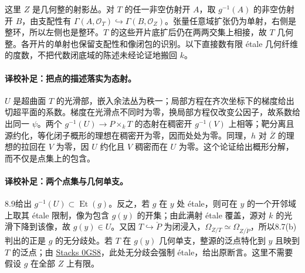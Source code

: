这里 $Z$ 是几何整的射影丛。对 $T$ 的任一非空仿射开 $A$，取 $g^{-1}(A)$ 的非空仿射开 $B$，由支配性有 $\Gamma(A,\mathcal O_T)\hookrightarrow\Gamma(B,\mathcal O_Z)$。张量任意域扩张仍为单射，右侧是整环，所以左侧也是整环。$T$ 的这些开片底扩后仍在两两交集上相接，故 $T$ 几何整。各开片的单射也保留支配性和像闭包的识别。以下直接数有限 étale 几何纤维的度数，不把代数闭底域的陈述未经论证地搬回 $k$。

\paragraph{译校补足：把点的描述落实为态射。}
$U$ 是超曲面 $T$ 的光滑部，嵌入余法丛为秩一；局部方程在齐次坐标下的梯度给出切超平面的系数。梯度在光滑点不同时为零，换局部方程仅改变公因子，故系数给出同一 $\psi$。两个 $g^{-1}(U)\to P\times_k T$ 的态射在稠密开 $g^{-1}(V)$ 上相等；靶分离且源约化，等化闭子概形的理想在稠密开为零，因而处处为零。同理，$h$ 对 $\overline Z$ 的理想的拉回在 $V$ 为零，因 $U$ 约化且 $V$ 稠密而在 $U$ 为零。这个论证给出概形分解，而不仅是点集上的包含。

\endgroup


\hypertarget{D18-107-notes}{}

\begingroup
\def\PP{\mathbb P}\def\OO{\mathcal O}\def\Ocal{\mathcal O}
\def\F{\mathcal F}\def\G{\mathcal G}\def\N{\mathcal N}
\def\PD{\check P}\def\Pdual{\check P}
\def\Ys{Y^{\mathrm{sing}}}\def\Ysing{Y^{\mathrm{sing}}}
\def\Ds{Y^{\mathrm{sup\,sing}}}\def\Ysup{Y^{\mathrm{sup\,sing}}}
\def\cod{\operatorname{codim}}\def\Sing{\operatorname{Sing}}
\def\depth{\operatorname{depth}}\def\coprof{\operatorname{coprof}}
\def\Ass{\operatorname{Ass}}\def\Supp{\operatorname{Supp}}
\def\Gr{\operatorname{Gr}}\def\Spec{\operatorname{Spec}}\def\Proj{\operatorname{Proj}}


\paragraph{译校补足：两个点集与几何单支。}
8.9给出 $g^{-1}(U)\subset\operatorname{Et}(g)$。反之，若 $g$ 在 $y$ 处 étale，则可在 $y$ 的一个开邻域上取其 étale 限制，像为包含 $g(y)$ 的开集；由此满射 étale 覆盖，源对 $k$ 的光滑下降到该像，故 $g(y)\in U$。又因 $T\hookrightarrow\PD$ 为闭浸入，$\Omega_{Z/T}\simeq\Omega_{Z/\PD}$，所以8.7(b)判出的正是 $g$ 的无分歧处。若 $T$ 在 $g(y)$ 几何单支，整源的泛点特化到 $y$ 且映到 $T$ 的泛点；由 \href{https://stacks.math.columbia.edu/tag/0GS8}{Stacks 0GS8}，此处无分歧会强制 étale，给出原断言。这里不需要假设 $g$ 在全部 $Z$ 上有限。


